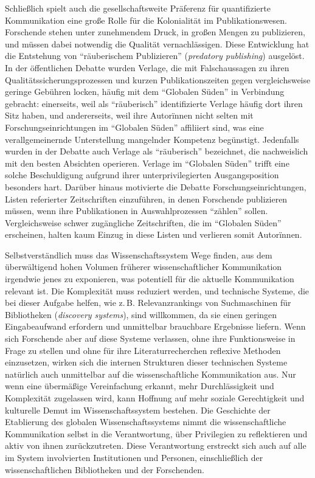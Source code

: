 \documentclass[a4paper,
fontsize=11pt,
oneside,
numbers=noperiodatend,
parskip=half-,
bibliography=totoc,
final
]{scrartcl}
\begin{document}
Schließlich spielt auch die gesellschaftsweite Präferenz für
quantifizierte Kommunikation eine große Rolle für die Kolonialität im
Publikationswesen. Forschende stehen unter zunehmendem Druck, in großen
Mengen zu publizieren, und müssen dabei notwendig die Qualität
vernachlässigen. Diese Entwicklung hat die Entstehung von
\enquote{räuberischem Publizieren} (\emph{predatory publishing})
ausgelöst. In der öffentlichen Debatte wurden Verlage, die mit
Falschaussagen zu ihren Qualitätssicherungsprozessen und kurzen
Publikationszeiten gegen vergleichsweise geringe Gebühren locken, häufig
mit dem \enquote{Globalen Süden} in Verbindung gebracht: einerseits,
weil als \enquote{räuberisch} identifizierte Verlage häufig dort ihren
Sitz haben, und andererseits, weil ihre Autorïnnen nicht selten mit
Forschungseinrichtungen im \enquote{Globalen Süden} affiliiert sind, was
eine verallgemeinernde Unterstellung mangelnder Kompetenz begünstigt.
Jedenfalls wurden in der Debatte auch Verlage als \enquote{räuberisch}
bezeichnet, die nachweislich mit den besten Absichten operieren. Verlage
im \enquote{Globalen Süden} trifft eine solche Beschuldigung aufgrund
ihrer unterprivilegierten Ausgangsposition besonders hart. Darüber
hinaus motivierte die Debatte Forschungseinrichtungen, Listen
referierter Zeitschriften einzuführen, in denen Forschende publizieren
müssen, wenn ihre Publikationen in Auswahlprozessen \enquote{zählen}
sollen. Vergleichsweise schwer zugängliche Zeitschriften, die im
\enquote{Globalen Süden} erscheinen, halten kaum Einzug in diese Listen
und verlieren somit Autorïnnen.

Selbstverständlich muss das Wissenschaftssystem Wege finden, aus dem
überwältigend hohen Volumen früherer wissenschaftlicher Kommunikation
irgendwie jenes zu exponieren, was potentiell für die aktuelle
Kommunikation relevant ist. Die Komplexität muss reduziert werden, und
technische Systeme, die bei dieser Aufgabe helfen, wie z. B.
Relevanzrankings von Suchmaschinen für Bibliotheken (\emph{discovery
systems}), sind willkommen, da sie einen geringen Eingabeaufwand
erfordern und unmittelbar brauchbare Ergebnisse liefern. Wenn sich
Forschende aber auf diese Systeme verlassen, ohne ihre Funktionsweise in
Frage zu stellen und ohne für ihre Literaturrecherchen reflexive
Methoden einzusetzen, wirken sich die internen Strukturen dieser
technischen Systeme natürlich auch unmittelbar auf die wissenschaftliche
Kommunikation aus. Nur wenn eine übermäßige Vereinfachung erkannt, mehr
Durchlässigkeit und Komplexität zugelassen wird, kann Hoffnung auf mehr
soziale Gerechtigkeit und kulturelle Demut im Wissenschaftssystem
bestehen. Die Geschichte der Etablierung des globalen
Wissenschaftssystems nimmt die wissenschaftliche Kommunikation selbst in
die Verantwortung, über Privilegien zu reflektieren und aktiv von ihnen
zurückzutreten. Diese Verantwortung erstreckt sich auch auf alle im
System involvierten Institutionen und Personen, einschließlich der
wissenschaftlichen Bibliotheken und der Forschenden.
\end{document}
